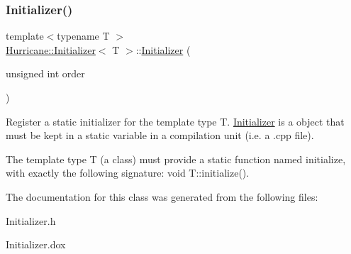 \subsubsection{\texorpdfstring{Initializer()}{Initializer()}}
{\footnotesize\ttfamily template$<$typename T $>$ \\
\hyperlink{classHurricane_1_1Initializer}{Hurricane\+::\+Initializer}$<$ T $>$\+::\hyperlink{classHurricane_1_1Initializer}{Initializer} (\begin{DoxyParamCaption}\item[{unsigned int}]{order }\end{DoxyParamCaption})\hspace{0.3cm}{\ttfamily [inline]}}

Register a static initializer for the template type {\ttfamily T}. \hyperlink{classHurricane_1_1Initializer}{Initializer} is a object that must be kept in a {\ttfamily static} variable in a compilation unit (i.\+e. a {\ttfamily }.cpp file).

The template type {\ttfamily T} (a class) must provide a static function named {\ttfamily initialize}, with exactly the following signature\+: {\ttfamily void T\+::initialize()}. 

The documentation for this class was generated from the following files\+:\begin{DoxyCompactItemize}
\item 
Initializer.\+h\item 
Initializer.\+dox\end{DoxyCompactItemize}
